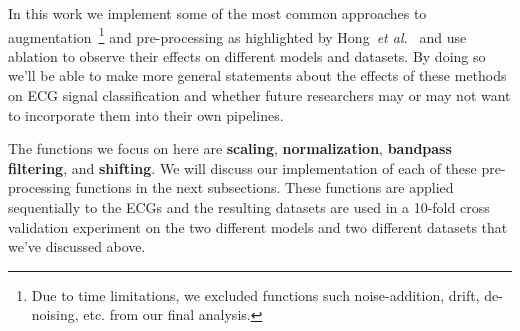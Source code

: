 \documentclass{article}
\begin{document}
In this work we implement some of the most common approaches to augmentation~\footnote{Due to time limitations, we excluded functions such noise-addition, drift, de-noising, etc. from our final analysis.} and pre-processing as highlighted by Hong~\textit{et al.}~\cite{hong2022practical} and use ablation to observe their effects on different models and datasets. By doing so we'll be able to make more general statements about the effects of these methods on ECG signal classification and whether future researchers may or may not want to incorporate them into their own pipelines. 

The functions we focus on here are \textbf{scaling}, \textbf{normalization}, \textbf{bandpass filtering}, and \textbf{shifting}. We will discuss our implementation of each of these pre-processing functions in the next subsections. These functions are applied sequentially to the ECGs and the resulting datasets are used in a 10-fold cross validation experiment on the two different models and two different datasets that we've discussed above. 
\end{document}
